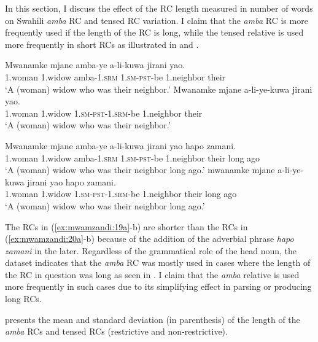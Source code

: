 \documentclass[output=paper,colorlinks,citecolor=brown]{langscibook}
\begin{document}
In this section, I discuss the effect of the RC length measured in number of words on Swahili \textit{amba} RC and tensed RC variation. I claim that the \textit{amba} RC is more frequently used if the length of the RC is long, while the tensed relative is used more frequently in short RCs as illustrated in  and .

\ea%
    \label{ex:mwamzandi:19}
    \ea%
    \label{ex:mwamzandi:19a}
    \gll    Mwanamke mjane amba-ye a-li-kuwa jirani yao.\\
            1.woman 1.widow amba\textsc{-1.srm} \textsc{1.sm-pst-}be 1.neighbor their\\
    \glt    ‘A (woman) widow who was their neighbor.’
    \ex%
    \label{ex:mwamzandi:19b}
    \gll    Mwanamke mjane a-li-ye-kuwa jirani yao.\\
            1.woman  1.widow  \textsc{1.sm-pst-1.srm-}be 1.neighbor their\\
    \glt    ‘A (woman) widow who was their neighbor.’
    \z
\z

\ea%
    \label{ex:mwamzandi:20}
    \ea%
    \label{ex:mwamzandi:20a}
    \gll    Mwanamke mjane amba-ye a-li-kuwa jirani yao hapo zamani.\\
            1.woman  1.widow  amba\textsc{-1.srm} \textsc{1.sm-pst-}be 1.neighbor their long ago\\
    \glt    ‘A (woman) widow who was their neighbor long ago.’
    \ex%
    \label{ex:mwamzandi:20b}
    \gll    mwanamke mjane a-li-ye-kuwa jirani yao hapo zamani.\\
            1.woman 1.widow \textsc{1.sm-pst-1.srm-}be 1.neighbor their long ago\\
    \glt    ‘A (woman) widow who was their neighbor long ago.’
    \z
\z

The RCs in (\ref{ex:mwamzandi:19a}-b) are shorter than the RCs in (\ref{ex:mwamzandi:20a}-b) because of the addition of the adverbial phrase \textit{hapo zamani} in the later. Regardless of the grammatical role of the head noun, the dataset indicates that the \textit{amba} RC was mostly used in cases where the length of the RC in question was long as seen in . I claim that the \textit{amba} relative is used more frequently in such cases due to its simplifying effect in parsing or producing long RCs.

 presents the mean and standard deviation (in parenthesis) of the length of the \textit{amba} RCs and tensed RCs (restrictive and non-restrictive).
\end{document}
